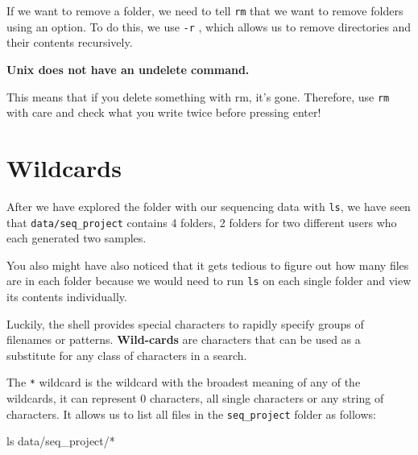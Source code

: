 \documentclass[
  letterpaper,
  DIV=11,
  numbers=noendperiod]{scrreprt}
\newenvironment{Shaded}{}{}
\newcommand{\FunctionTok}[1]{\textcolor[rgb]{0.44,0.26,0.76}{#1}}
\newcommand{\NormalTok}[1]{\textcolor[rgb]{0.14,0.16,0.18}{#1}}
\newcommand{\PreprocessorTok}[1]{\textcolor[rgb]{0.84,0.23,0.29}{#1}}
\begin{document}
If we want to remove a folder, we need to tell \texttt{rm} that we want
to remove folders using an option. To do this, we use \texttt{-r} ,
which allows us to remove directories and their contents recursively.

\begin{tcolorbox}[enhanced jigsaw, title=\textcolor{quarto-callout-important-color}{\faExclamation}\hspace{0.5em}{Important}, colframe=quarto-callout-important-color-frame, opacitybacktitle=0.6, rightrule=.15mm, arc=.35mm, left=2mm, colbacktitle=quarto-callout-important-color!10!white, bottomrule=.15mm, leftrule=.75mm, toprule=.15mm, opacityback=0, bottomtitle=1mm, colback=white, toptitle=1mm, breakable, titlerule=0mm, coltitle=black]

\textbf{Unix does not have an undelete command.}

This means that if you delete something with rm, it's gone. Therefore,
use \texttt{rm} with care and check what you write twice before pressing
enter!

\end{tcolorbox}

\section{Wildcards}\label{wildcards}

After we have explored the folder with our sequencing data with
\texttt{ls}, we have seen that \texttt{data/seq\_project} contains 4
folders, 2 folders for two different users who each generated two
samples.

You also might have also noticed that it gets tedious to figure out how
many files are in each folder because we would need to run \texttt{ls}
on each single folder and view its contents individually.

Luckily, the shell provides special characters to rapidly specify groups
of filenames or patterns. \textbf{Wild-cards} are characters that can be
used as a substitute for any class of characters in a search.

The \texttt{*} wildcard is the wildcard with the broadest meaning of any
of the wildcards, it can represent 0 characters, all single characters
or any string of characters. It allows us to list all files in the
\texttt{seq\_project} folder as follows:

\begin{Shaded}
\begin{Highlighting}[]
\FunctionTok{ls}\NormalTok{ data/seq\_project/}\PreprocessorTok{*}
\end{Highlighting}
\end{Shaded}
\end{document}

